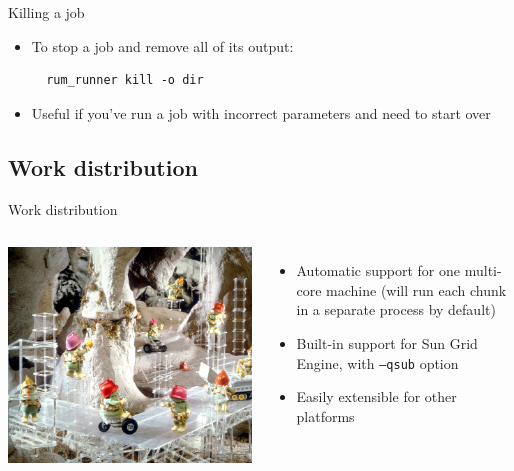 \documentclass{beamer}
\begin{document}
\begin{frame}[fragile]{Killing a job}
\begin{itemize}
\item To stop a job and remove all of its output:
\begin{verbatim}
  rum_runner kill -o dir
\end{verbatim}
\item Useful if you've run a job with incorrect parameters and need to start over
\end{itemize}
\end{frame}

\subsection{Work distribution}

\begin{frame}{Work distribution}
  \begin{columns}
    \column{2in}
    \includegraphics[scale=0.8]{doozers.jpg}    
    \column{3in}
    \begin{itemize}
    \item Automatic support for one multi-core machine (will run each chunk in a separate process by default)
    \item Built-in support for Sun Grid Engine, with \texttt{--qsub} option
    \item Easily extensible for other platforms
    \end{itemize}
  \end{columns}
\end{frame}
\end{document}
